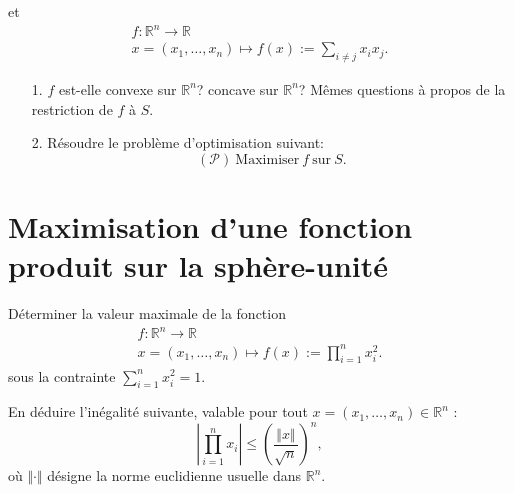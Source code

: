 \documentclass[11pt, a4paper]{article}
\begin{document}
et 
$$  \begin{array}{c}
    f : \mathbb{R}^n \rightarrow \mathbb{R} \\
    x = (x_1,\dots ,x_n) \longmapsto f(x) := \displaystyle{ \sum_{i\neq j}} x_i x_j. 
   \end{array}
$$


\begin{itemize}
 \item[1.] $f$ est-elle convexe sur $\mathbb{R}^n$? concave sur $\mathbb{R}^n$? Mêmes questions à propos de la restriction de $f$ à $S$.
 \item[2.] Résoudre le problème d'optimisation suivant:
 $$ (\mathcal{P}) \ \text{Maximiser} \ f \ \text{sur} \ S .$$
\end{itemize}

\section*{Maximisation d'une fonction produit sur la sphère-unité}

Déterminer la valeur maximale de la fonction
$$  \begin{array}{c}
    f : \mathbb{R}^n \rightarrow \mathbb{R} \\
    x = (x_1,\dots ,x_n) \longmapsto f(x) := \displaystyle{ \prod_{i=1}^n} x_i^2. 
   \end{array}
$$
sous la contrainte $ \sum_{i=1}^n x_i^2 = 1$.

En déduire l'inégalité suivante, valable pour tout $x = (x_1,\dots ,x_n) \in \mathbb{R}^n$ :
$$ \left| \prod_{i=1}^n x_i \right| \leq \left( \dfrac{\Vert x \Vert}{\sqrt{n}} \right)^n,$$
où $\Vert \cdot \Vert$ désigne la norme euclidienne usuelle dans $\mathbb{R}^n$.

%
\end{document}
